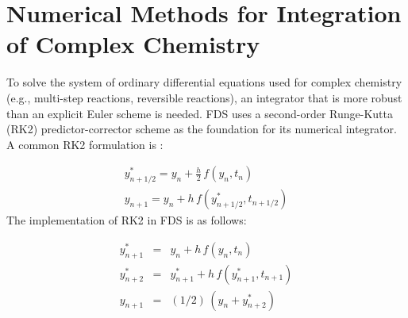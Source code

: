 \chapter{Numerical Methods for Integration of Complex Chemistry}

\label{chemistry_integration}

To solve the system of ordinary differential equations used for complex chemistry (e.g., multi-step reactions, reversible reactions), an integrator that is more robust than an explicit Euler scheme is needed. FDS uses a second-order Runge-Kutta (RK2) predictor-corrector scheme as the foundation for its numerical integrator. A common RK2 formulation is \cite{Moin:2001}:

\begin{eqnarray}\label{RK2_moin}
y^*_{n+1/2}=y_n+\frac{h}{2}\,f(y_{n},t_{n}) \\
\nonumber y_{n+1}=y_{n}+h\,f(y^*_{n+1/2},t_{n+1/2})
\end{eqnarray}
The implementation of RK2 in FDS is as follows:

\begin{eqnarray}\label{RK2}
y^*_{n+1}           &=& y_n+h\,f(y_{n},t_{n}) \\
\nonumber y^*_{n+2} &=& y^*_{n+1}+h\,f(y^*_{n+1},t_{n+1}) \\
\nonumber y_{n+1} &=& (1/2)\,(y_{n}+y^*_{n+2})
\end{eqnarray} 

